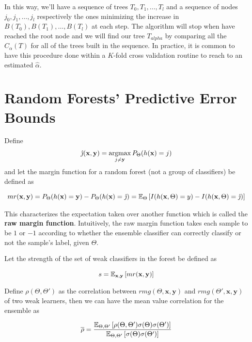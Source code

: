 In this way, we'll have a sequence of trees $T_0,T_1,\ldots,T_l$ and a sequence of nodes $j_0, j_1,\ldots,j_l$ respectively the ones minimizing the increase in $B(T_0),B(T_1),\ldots,B(T_l)$ at each step. The algorithm will stop when have reached the root node and we will find our tree $T_{alpha}$ by comparing all the $C_\alpha(T)$ for all of the trees built in the sequence. In practice, it is common to have this procedure done within a $K$-fold cross validation routine to reach to an estimated $\hat{\alpha}$.


\section{Random Forests' Predictive Error Bounds}\label{appx:sec:rforest_predictive_error_bounds}


Define $$\hat{\jmath}( \textbf{x},\textbf{y}) = \operatorname*{argmax}_{j \neq \textbf{y}} P_{\Theta}(h(\textbf{x}) = j)$$ and let the margin function for a random forest (not a group of classifiers) be defined as

\[\label{eq:rf-marginFunRf}
mr(\textbf{x},\textbf{y}) = P_{\Theta}(h(\textbf{x}) = \textbf{y}) - P_{\Theta}(h(\textbf{x}) = \hat{\jmath})
\\
= \operatorname{\mathbb{E}}_{\Theta} \left[ I(h(\textbf{x},\Theta ) = y ) - I( h( \textbf{x},\Theta ) = \hat{\jmath} ) \right]
\]

This characterizes the expectation taken over another function which is called the \textbf{raw margin function}\label{eq:rf-rawMarginFun}.
Intuitively, the raw margin function takes each sample to be $1$ or $-1$ according to whether the ensemble classifier can correctly classify or not the sample's label, given $\Theta$.

Let the strength of the set of weak classifiers in the forest be defined as

\begin{equation}\label{eq:rf-strength}
s = \operatorname{\mathbb{E}}_{\textbf{x},\textbf{y}} \left[ mr(\textbf{x},\textbf{y} ) \right]
\end{equation}

Define $ \rho(\Theta, \Theta')$ as the correlation between $rmg(\Theta,\textbf{x},\textbf{y})$ and $rmg(\Theta',\textbf{x},\textbf{y})$ of two weak learners, then we can have the mean value correlation for the ensemble as

\begin{equation}\label{eq:rf-meanCorrelation}
\overline{\rho} = \frac{\operatorname{\mathbb{E}}_{\Theta, \Theta'} \left[ \rho(\Theta, \Theta') \sigma(\Theta) \sigma(\Theta')\right]}
{\operatorname{\mathbb{E}}_{\Theta, \Theta'} \left[ \sigma(\Theta) \sigma(\Theta')\right]}
\end{equation}

